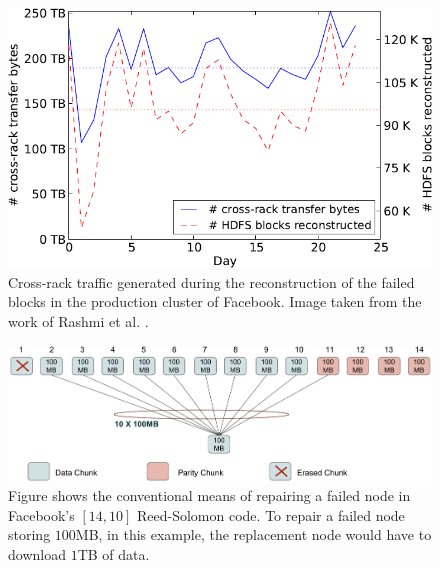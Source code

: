 		\begin{figure}[!h]
		\centering
		\includegraphics[scale=.55]{src/Figures/chap4/fb_repairtraffic} 
		\caption{Cross-rack traffic generated during the reconstruction of the failed blocks in the production cluster of Facebook. Image taken from the work of Rashmi et al. \cite{Rashmi_fbcluster}.}  \label{fig:FB_repairtraffic}    
		\end{figure}

			\begin{figure}[!h]
				\centering
				\includegraphics[scale=.6]{src/Figures/chap4/rs_14_10}  
				\caption{Figure shows the conventional means of repairing a failed node in Facebook's $[14,10]$ Reed-Solomon code. To repair a failed node storing $100$MB, in this example, the replacement node would have to download $1$TB of data.}  \label{fig:rs_14_10}    
			\end{figure}

